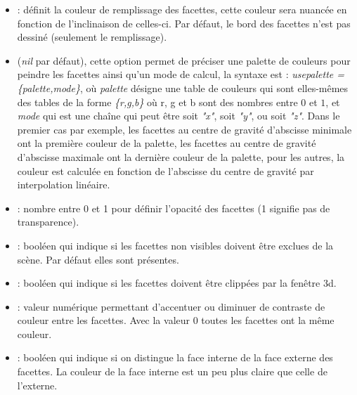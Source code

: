     \begin{itemize}
        \item {} : définit la couleur de remplissage des facettes, cette couleur sera nuancée en fonction de l'inclinaison de celles-ci. Par défaut, le bord des facettes n'est pas dessiné (seulement le remplissage).
        \item {} (\emph{nil} par défaut), cette option permet de préciser une palette de couleurs pour peindre les facettes ainsi qu'un mode de calcul, la syntaxe est : \emph{usepalette = \{palette,mode\}}, où \emph{palette} désigne une table de couleurs qui sont elles-mêmes des tables de la forme \emph{\{r,g,b\}} où r, g et b sont des nombres entre $0$ et $1$, et \emph{mode} qui est une chaîne qui peut être soit \emph{"x"}, soit \emph{"y"}, ou soit \emph{"z"}. Dans le premier cas par exemple, les facettes au centre de gravité d'abscisse minimale ont la première couleur de la palette, les facettes au centre de gravité d'abscisse maximale ont la dernière couleur de la palette, pour les autres, la couleur est calculée en fonction de l'abscisse du centre de gravité par interpolation linéaire.        
        \item {} : nombre entre 0 et 1 pour définir l'opacité des facettes (1 signifie pas de transparence).
        \item {} : booléen qui indique si les facettes non visibles doivent être exclues de la scène. Par défaut elles sont présentes.
        \item {} : booléen qui indique si les facettes doivent être clippées par la fenêtre 3d.
        \item {} : valeur numérique permettant d'accentuer ou diminuer de contraste de couleur entre les facettes. Avec la valeur 0 toutes les facettes ont la même couleur.
        \item {} : booléen qui indique si on distingue la face interne de la face externe des facettes. La couleur de la face interne est un peu plus claire que celle de l'externe.
        

\end{itemize}
